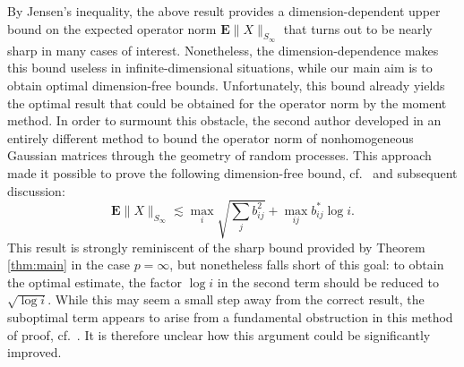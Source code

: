 \documentclass[10pt,reqno]{amsart}
\theoremstyle{definition}
\numberwithin{equation}{section}
\numberwithin{figure}{section}
\numberwithin{table}{section}
\begin{document}
By Jensen's inequality, the above result provides a dimension-dependent 
upper bound on the expected operator norm $\mathbf{E}\|X\|_{S_\infty}$ 
that turns out to be nearly sharp in many cases of interest. 
Nonetheless, the dimension-dependence makes this bound useless in 
infinite-dimensional situations, while our main aim is to obtain optimal 
dimension-free bounds. Unfortunately, this bound already yields the 
optimal result that could be obtained for the operator norm by the moment 
method.
In order to surmount this obstacle, the second author developed in 
\cite{vH17} an entirely different method to bound the operator norm of 
nonhomogeneous Gaussian matrices through the geometry of random processes.
This approach made it possible to prove the following dimension-free 
bound, cf.\ \cite[Theorem 1.4]{vH17} and subsequent discussion:
$$
        \mathbf{E}\|X\|_{S_\infty}\lesssim
        \max_i\sqrt{\sum_j b_{ij}^2} +
        \max_{ij}b_{ij}^*\log i.
$$
This result is strongly reminiscent of the sharp bound provided by
Theorem \ref{thm:main} in the case $p=\infty$, but nonetheless falls short 
of this goal: to obtain the optimal estimate, the factor $\log i$ in the 
second term should be reduced to $\sqrt{\log i}$. While this may seem
a small step away from the correct result, the suboptimal term appears 
to arise from a fundamental obstruction in this method of 
proof, cf.\ \cite[section 4.3]{vH17}. It is therefore 
unclear how this argument could be significantly improved.
\end{document}
